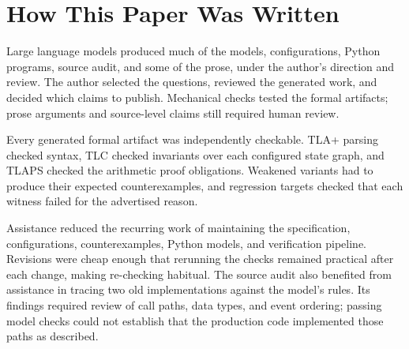 \documentclass[final,5p,times,twocolumn,number]{elsarticle}
\begin{document}
\section{How This Paper Was Written}\label{sec:llm}

Large language models produced much of the models, configurations, Python programs, source audit, and some of the prose, under the author's direction and review.  The author selected the questions, reviewed the generated work, and decided which claims to publish.  Mechanical checks tested the formal artifacts; prose arguments and source-level claims still required human review.

Every generated formal artifact was independently checkable.  TLA+ parsing checked syntax, TLC checked invariants over each configured state graph, and TLAPS checked the arithmetic proof obligations.  Weakened variants had to produce their expected counterexamples, and regression targets checked that each witness failed for the advertised reason.

Assistance reduced the recurring work of maintaining the specification, configurations, counterexamples, Python models, and verification pipeline.  Revisions were cheap enough that rerunning the checks remained practical after each change, making re-checking habitual.  The source audit also benefited from assistance in tracing two old implementations against the model's rules.  Its findings required review of call paths, data types, and event ordering; passing model checks could not establish that the production code implemented those paths as described.
\end{document}
